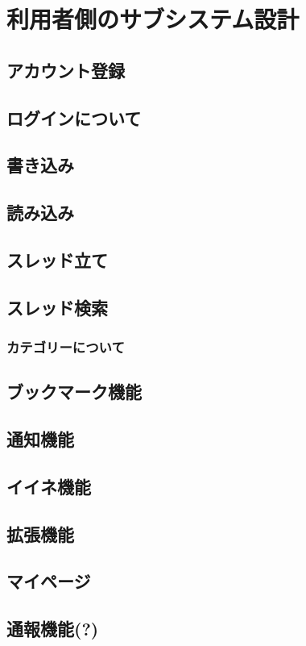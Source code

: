 \documentclass[a4j]{jarticle}
\begin{document}
\section{利用者側のサブシステム設計}
\subsection{アカウント登録}
\subsection{ログインについて}
\subsection{書き込み}
\subsection{読み込み}
\subsection{スレッド立て}
\subsection{スレッド検索}
\subsubsection{カテゴリーについて}
\subsection{ブックマーク機能}
\subsection{通知機能}
\subsection{イイネ機能}
\subsection{拡張機能}
\subsection{マイページ}
\subsection{通報機能(?)}
\end{document}
